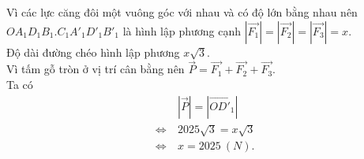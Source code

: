 \begin{bt}
{		Vì các lực căng đôi một vuông góc với nhau và có độ lớn bằng nhau nên $OA_1D_1B_1.C_1A'_1D'_1B'_1$ là hình lập phương cạnh $\left| \overrightarrow{F_1}\right|=\left| \overrightarrow{F_2}\right|=\left| \overrightarrow{F_3}\right|=x$.\\
		Độ dài đường chéo hình lập phương $x\sqrt{3}$.\\
		Vì tấm gỗ tròn ở vị trí cân bằng nên $\overrightarrow{P}=\overrightarrow{F_1}+\overrightarrow{F_2}+ \overrightarrow{F_3}$.\\
		Ta có
		\begin{align*}
			&~\left| \overrightarrow{P}\right|=\left| \overrightarrow{OD'_1}\right|\\ 
			\Leftrightarrow &~2025\sqrt{3}=x\sqrt{3}\\ 
			\Leftrightarrow &~x=2025~(N).
		\end{align*}
	}
\end{bt}

